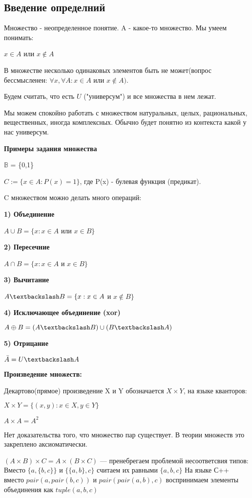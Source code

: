 
\subsection{Введение определний}
Множество - неопределенное понятие. A - какое-то множество. Мы умеем понимать:

$x \in A$ или $x \notin A$ 

В множестве несколько одинаковых элементов быть не может(вопрос бессмысленен:  $\forall x, \forall A: x \in  A  $ или $ x \notin A).$

Будем считать, что есть $U$ ("универсум") и все множества в нем лежат.

Мы можем спокойно работать с множеством натуральных, целых, рациональных, вещественных, иногда комплексных. Обычно будет понятно из контекста какой у нас универсум.

\textbf{Примеры задания множества}

$\mathbb{B}$ = \{0,1\}

$C:=\{x \in A: P(x) = 1\}$, где P(x) - булевая функция (предикат).

C множеством можно делать много операций:

\textbf{1) Объединение}

$A \cup B = \{x: x \in A$  или $x \in B \}$

\textbf{2) Пересечние}

$A \cap B = \{x: x \in A$ и $x \in B \}$

\textbf{3) Вычитание}

$A \textbackslash B = \{x: x \in A$ и $x \notin B \}$

\textbf{4) Исключающее объединение (xor)}

$A \oplus B = (A \textbackslash B) \cup (B \textbackslash A)$

\textbf{5) Отрицание}

$\bar{A} = U \textbackslash A$

\textbf{Произведение множеств:}

Декартово(прямое) произведение X и Y обозначается $X \times Y$, на языке кванторов:

$X \times Y = \{(x,y):x \in X, y \in Y\}$ 

$A \times A = A^2$

Нет доказательства того, что множество пар существует. В теории множеств это закреплено аксиоматически.

$(A \times B) \times C = A \times (B \times C)$ --- пренебрегаем проблемой несоответсвия типов:
Вместо $\{a, \{b, c\}\}$ и $\{\{a, b\}, c\}$ считаем их равными $\{a, b, c\}$
На языке С++ вместо $pair(a, pair(b, c))$  и $pair(pair(a, b), c)$  воспринимаем элементы объединения как $tuple(a, b, c)$

